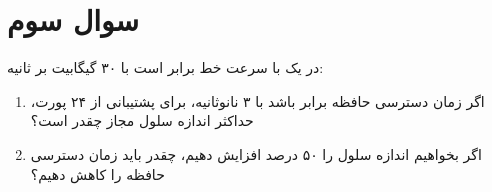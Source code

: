\section{سوال سوم}

در یک  با سرعت خط برابر است با ۳۰ گیگابیت بر ثانیه:

\begin{enumerate}
	\item 
	اگر زمان دسترسی حافظه برابر باشد با ۳ نانوثانیه، برای پشتیبانی از ۲۴ پورت، حداکثر اندازه سلول مجاز چقدر است؟
	
	\item 
	اگر بخواهیم اندازه سلول را ۵۰ درصد افزایش دهیم، چقدر باید زمان دسترسی حافظه را کاهش دهیم؟
\end{enumerate}